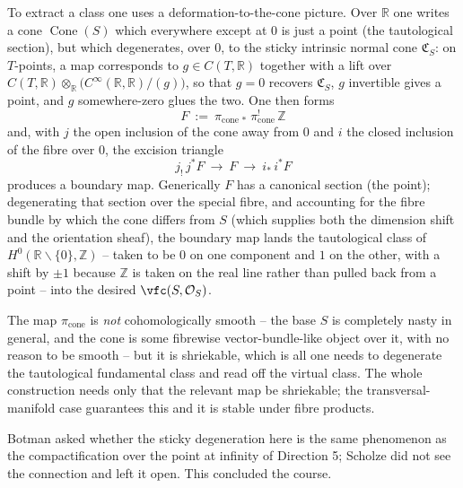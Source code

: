 To extract a class one uses a deformation-to-the-cone picture. Over $\mathbb R$ one
writes a cone $\operatorname{Cone}(S)$ which everywhere except at $0$ is just a
point (the tautological section), but which degenerates, over $0$, to the sticky
intrinsic normal cone $\mathfrak C_S$: on $T$-points, a map corresponds to
$g\in C(T,\mathbb R)$ together with a lift over
$C(T,\mathbb R)\otimes_{\mathbb R}\bigl(C^\infty(\mathbb R,\mathbb R)/(g)\bigr)$,
so that $g=0$ recovers $\mathfrak C_S$, $g$ invertible gives a point, and $g$
somewhere-zero glues the two. One then forms
\begin{equation*}
F\ :=\ \pi_{\mathrm{cone}\,*}\,\pi_{\mathrm{cone}}^{!}\,\mathbb Z
\end{equation*}
and, with $j$ the open inclusion of the cone away from $0$ and $i$ the closed
inclusion of the fibre over $0$, the excision triangle
\begin{equation*}
j_!\,j^*F\ \longrightarrow\ F\ \longrightarrow\ i_*\,i^*F
\end{equation*}
produces a boundary map. Generically $F$ has a canonical section (the point);
degenerating that section over the special fibre, and accounting for the fibre
bundle by which the cone differs from $S$ (which supplies both the dimension shift
and the orientation sheaf), the boundary map lands the tautological class of
$H^0(\mathbb R\smallsetminus\{0\},\mathbb Z)$ -- taken to be $0$ on one component
and $1$ on the other, with a shift by $\pm1$ because $\mathbb Z$ is taken on the
real line rather than pulled back from a point -- into the desired
$\vfc(S,\mathcal O_S)$.

\begin{remark}
\label{rmk:24:cone-shriekable}
The map $\pi_{\mathrm{cone}}$ is \emph{not} cohomologically smooth -- the base
$S$ is completely nasty in general, and the cone is some fibrewise
vector-bundle-like object over it, with no reason to be smooth -- but it is
shriekable, which is all one needs to degenerate the tautological fundamental
class and read off the virtual class. The whole construction needs only that the
relevant map be shriekable; the transversal-manifold case guarantees this and it
is stable under fibre products.
\end{remark}

\begin{remark}[Closing]
\label{rmk:24:closing}
Botman asked whether the sticky degeneration here is the same phenomenon as the
compactification over the point at infinity of Direction 5; Scholze did not see
the connection and left it open. This concluded the course.
\end{remark}
